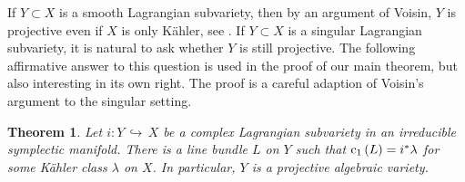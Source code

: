 \documentclass[a4paper,11pt,final]{amsart}
\theoremstyle{plain}
\newtheorem{theorem}[subsection]{Theorem}
\theoremstyle{definition}
\numberwithin{equation}{section}
\theoremstyle{remark}
\begin{document}
If $Y\subset X$ is a smooth Lagrangian subvariety, then by an argument of Voisin, $Y$ is projective even if $X$ is only K\"ahler, see \cite[Prop 2.1]{Ca06}. If $Y\subset X$ is a singular Lagrangian subvariety, it is natural to ask whether $Y$ is still projective. The following affirmative answer to this question  is used in the proof of our main theorem, but also interesting in its own right.
 The proof is a careful adaption of Voisin's argument to the singular setting. 
\begin{theorem}\label{theorem line bundle}
Let $i: Y {{\, \hookrightarrow\,}} X$ be a complex Lagrangian subvariety in an irreducible symplectic manifold. There is a line bundle $L$ on $Y$ such that ${{\rm c}}_1\left(L\right) = i^* \lambda$ for some K\"ahler class $\lambda$ on $X$. In particular, $Y$ is a projective algebraic variety.
\end{theorem}
\end{document}
